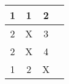 \begin{tabular}[12pt]{ |c| c| c|c|} 
    \hline
    1& 1& 2& \\ 
    \hline
    2& X & 3 & \\
    \hline 
    2 & X & 4 & \\
    \hline
    1 & 2 & X& \\
    \hline   
    \end{tabular}